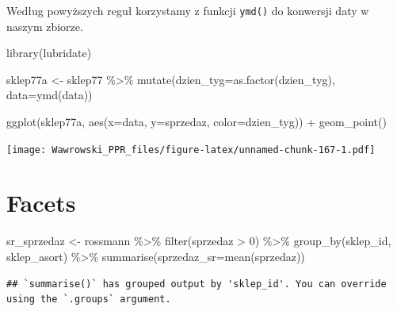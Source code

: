 \documentclass[
]{book}
\newenvironment{Shaded}{\begin{snugshade}}{\end{snugshade}}
\newcommand{\AttributeTok}[1]{\textcolor[rgb]{0.77,0.63,0.00}{#1}}
\newcommand{\DecValTok}[1]{\textcolor[rgb]{0.00,0.00,0.81}{#1}}
\newcommand{\FunctionTok}[1]{\textcolor[rgb]{0.00,0.00,0.00}{#1}}
\newcommand{\NormalTok}[1]{#1}
\newcommand{\OtherTok}[1]{\textcolor[rgb]{0.56,0.35,0.01}{#1}}
\newcommand{\SpecialCharTok}[1]{\textcolor[rgb]{0.00,0.00,0.00}{#1}}
\begin{document}
Według powyższych reguł korzystamy z funkcji \texttt{ymd()} do konwersji daty w naszym zbiorze.

\begin{Shaded}
\begin{Highlighting}[]
\FunctionTok{library}\NormalTok{(lubridate)}

\NormalTok{sklep77a }\OtherTok{\textless{}{-}}\NormalTok{ sklep77 }\SpecialCharTok{\%\textgreater{}\%}
  \FunctionTok{mutate}\NormalTok{(}\AttributeTok{dzien\_tyg=}\FunctionTok{as.factor}\NormalTok{(dzien\_tyg),}
         \AttributeTok{data=}\FunctionTok{ymd}\NormalTok{(data))}

\FunctionTok{ggplot}\NormalTok{(sklep77a, }\FunctionTok{aes}\NormalTok{(}\AttributeTok{x=}\NormalTok{data,}
                    \AttributeTok{y=}\NormalTok{sprzedaz,}
                    \AttributeTok{color=}\NormalTok{dzien\_tyg)) }\SpecialCharTok{+}
  \FunctionTok{geom\_point}\NormalTok{()}
\end{Highlighting}
\end{Shaded}

\texttt{[image: Wawrowski\_PPR\_files/figure-latex/unnamed-chunk-167-1.pdf]}

\hypertarget{facets}{%
\section{Facets}\label{facets}}

\begin{Shaded}
\begin{Highlighting}[]
\NormalTok{sr\_sprzedaz }\OtherTok{\textless{}{-}}\NormalTok{ rossmann }\SpecialCharTok{\%\textgreater{}\%}
  \FunctionTok{filter}\NormalTok{(sprzedaz }\SpecialCharTok{\textgreater{}} \DecValTok{0}\NormalTok{) }\SpecialCharTok{\%\textgreater{}\%}
  \FunctionTok{group\_by}\NormalTok{(sklep\_id, sklep\_asort) }\SpecialCharTok{\%\textgreater{}\%}
  \FunctionTok{summarise}\NormalTok{(}\AttributeTok{sprzedaz\_sr=}\FunctionTok{mean}\NormalTok{(sprzedaz))}
\end{Highlighting}
\end{Shaded}

\begin{verbatim}
## `summarise()` has grouped output by 'sklep_id'. You can override using the `.groups` argument.
\end{verbatim}
\end{document}
